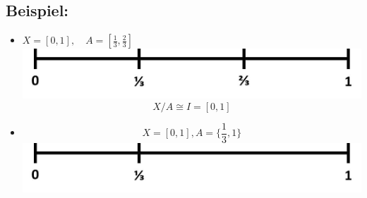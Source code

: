 \documentclass[a4paper,11pt,notitlepage]{report}
\newenvironment{bsp}[1]
{
\setlength{\fboxsep}{10pt}
\subsection*{Beispiel: #1}
\begin{upshape}
}
{
\end{upshape}
}
\begin{document}
\begin{bsp}{}
	\begin{itemize}
		\item $X = [0,1], \quad A = [\frac{1}{3}, \frac{2}{3}]$ \includegraphics[scale=0.4]{images/0_1_drittel.jpg}
	$$X/A \cong I = [0,1]$$
		\item $$ X = [0,1], A = \{\frac{1}{3}, 1\}$$ \includegraphics[scale=0.4]{images/0_1_drittel_2.jpg}

\end{itemize}
\end{bsp}
\end{document}
